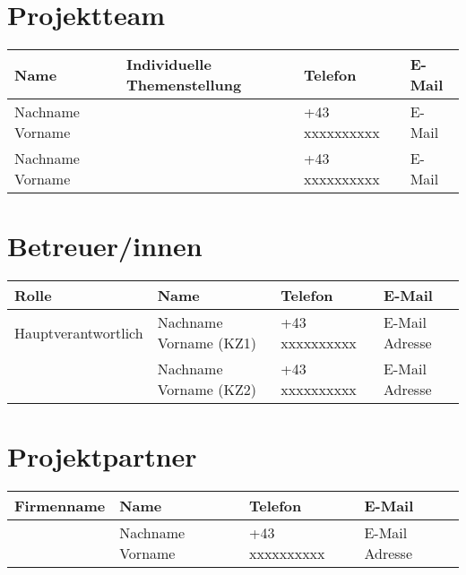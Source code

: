 \documentclass[12pt]{article}
\begin{document}


\section*{Projektteam}
\begin{center}
    \begin{tabular}{| l | l | l | l |}
        \hline
        \textbf{Name} & \textbf{Individuelle Themenstellung} & \textbf{Telefon} & \textbf{E-Mail} \\
        \hline
        Nachname Vorname &  & +43 xxxxxxxxxx & E-Mail \\
        \hline
        Nachname Vorname &  & +43 xxxxxxxxxx & E-Mail \\
        \hline
    \end{tabular}
\end{center}

\section*{Betreuer/innen}
\begin{center}
    \begin{tabular}{| l | l | l | l |}
        \hline
        \textbf{Rolle} & \textbf{Name} & \textbf{Telefon} & \textbf{E-Mail} \\
        \hline
        Hauptverantwortlich & Nachname Vorname (KZ1) & +43 xxxxxxxxxx & E-Mail Adresse \\
        \hline
         & Nachname Vorname (KZ2) & +43 xxxxxxxxxx & E-Mail Adresse \\
        \hline
    \end{tabular}
\end{center}

\section*{Projektpartner}
\begin{center}
    \begin{tabular}{| l | l | l | l |}
        \hline
        \textbf{Firmenname} & \textbf{Name} & \textbf{Telefon} & \textbf{E-Mail} \\
        \hline
         & Nachname Vorname & +43 xxxxxxxxxx & E-Mail Adresse \\
        \hline
    \end{tabular}
\end{center}
\end{document}
